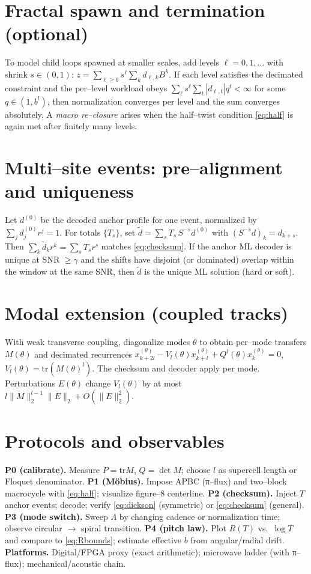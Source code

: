 \documentclass[11pt]{article}
\theoremstyle{definition}
\theoremstyle{remark}
\newcommand{\tr}{\mathrm{tr}}
\begin{document}
\section{Fractal spawn and termination (optional)}
To model child loops spawned at smaller scales, add levels $\ell=0,1,\dots$ with shrink $s\in(0,1)$:
$z=\sum_{\ell\ge 0} s^\ell \sum_k d_{\ell,k} B^{k}$.
If each level satisfies the decimated constraint and the per--level workload obeys
$\sum_\ell s^\ell \sum_{t} |d_{\ell,t}| q^{t}<\infty$ for some $q\in(1, b^l)$, then normalization converges per level and the sum converges absolutely.
A \emph{macro re--closure} arises when the half--twist condition \eqref{eq:half} is again met after finitely many levels.

\section{Multi--site events: pre--alignment and uniqueness}
Let $d^{(0)}$ be the decoded anchor profile for one event, normalized by $\sum_j d^{(0)}_j r^j=1$.
For totals $\{T_s\}$, set $\tilde d=\sum_s T_s\, S^{-s} d^{(0)}$ with $(S^{-s}d)_k=d_{k+s}$.
Then $\sum_k \tilde d_k r^k = \sum_s T_s r^s$ matches \eqref{eq:checksum}. If the anchor ML decoder is unique at SNR $\ge\gamma$ and the shifts
have disjoint (or dominated) overlap within the window at the same SNR, then $\tilde d$ is the unique ML solution (hard or soft).

\section{Modal extension (coupled tracks)}
With weak transverse coupling, diagonalize modes $\theta$ to obtain per--mode transfers $M(\theta)$ and decimated recurrences
$x^{(\theta)}_{k+2l}-V_l(\theta) x^{(\theta)}_{k+l}+Q^l(\theta) x^{(\theta)}_k=0$, $V_l(\theta)=\tr(M(\theta)^l)$.
The checksum and decoder apply per mode. Perturbations $E(\theta)$ change $V_l(\theta)$ by at most $l\|M\|_2^{l-1}\|E\|_2+O(\|E\|_2^2)$.

\section{Protocols and observables}
\textbf{P0 (calibrate).} Measure $P=\tr M$, $Q=\det M$; choose $l$ as supercell length or Floquet denominator.
\textbf{P1 (Möbius).} Impose APBC (π--flux) and two--block macrocycle with \eqref{eq:half}; visualize figure--8 centerline.
\textbf{P2 (checksum).} Inject $T$ anchor events; decode; verify \eqref{eq:dickson} (symmetric) or \eqref{eq:checksum} (general).
\textbf{P3 (mode switch).} Sweep $\Lambda$ by changing cadence or normalization time; observe circular $\to$ spiral transition.
\textbf{P4 (pitch law).} Plot $R(T)$ vs.\ $\log T$ and compare to \eqref{eq:Rbounds}; estimate effective $b$ from angular/radial drift.
\textbf{Platforms.} Digital/FPGA proxy (exact arithmetic); microwave ladder (with π--flux); mechanical/acoustic chain.
\end{document}
